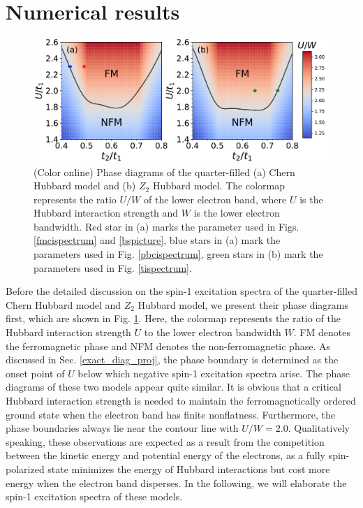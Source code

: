 \documentclass[amsmath,superscriptaddress,showpacs,aps,prb,twocolumn]{revtex4-1}
\begin{document}
\section{Numerical results}\label{nr}
\begin{figure}
\includegraphics[width=\columnwidth]{phase}
\caption{(Color online) Phase diagrams of the quarter-filled (a) Chern Hubbard model and (b) $Z_2$ Hubbard model. The colormap represents the ratio $U/W$ of the lower electron band, where $U$ is the Hubbard interaction strength and $W$ is the lower electron bandwidth. Red star in (a) marks the parameter used in Figs. \ref{fmcispectrum} and \ref{bspicture}, blue stars in (a) mark the parameters used in Fig. \ref{pbcispectrum}, green stars in (b) mark the parameters used in Fig. \ref{tispectrum}.}
\label{phase}
\end{figure}

\par Before the detailed discussion on the spin-1 excitation spectra of the quarter-filled Chern Hubbard model and $Z_2$ Hubbard model, we present their phase diagrams first, which are shown in Fig. \ref{phase}. Here, the colormap represents the ratio of the Hubbard interaction strength $U$ to the lower electron bandwidth $W$. FM denotes the ferromagnetic phase and NFM denotes the non-ferromagnetic phase. As discussed in Sec. \ref{exact_diag_proj}, the phase boundary is determined as the onset point of $U$ below which negative spin-1 excitation spectra arise. The phase diagrams of these two models appear quite similar. It is obvious that a critical Hubbard interaction strength is needed to maintain the ferromagnetically ordered ground state when the electron band has finite nonflatness. Furthermore, the phase boundaries always lie near the contour line with $U/W=2.0$. Qualitatively speaking, these observations are expected as a result from the competition between the kinetic energy and potential energy of the electrons, as a fully spin-polarized state minimizes the energy of Hubbard interactions but cost more energy when the electron band disperses. In the following, we will elaborate the spin-1 excitation spectra of these models.
\end{document}
